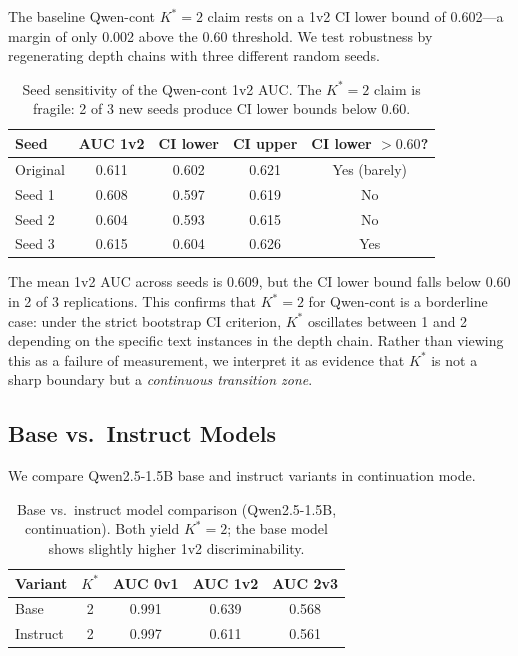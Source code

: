 \documentclass[11pt]{article}
\begin{document}
The baseline Qwen-cont $K^*{=}2$ claim rests on a 1v2 CI lower bound of 0.602---a margin of only 0.002 above the 0.60 threshold. We test robustness by regenerating depth chains with three different random seeds.

\begin{table}[h]
\centering
\caption{Seed sensitivity of the Qwen-cont 1v2 AUC. The $K^*{=}2$ claim is fragile: 2 of 3 new seeds produce CI lower bounds below 0.60.}
\label{tab:seeds}
\begin{tabular}{lcccc}
\toprule
Seed & AUC 1v2 & CI lower & CI upper & CI lower $> 0.60$? \\
\midrule
Original & 0.611 & 0.602 & 0.621 & Yes (barely) \\
Seed 1 & 0.608 & 0.597 & 0.619 & No \\
Seed 2 & 0.604 & 0.593 & 0.615 & No \\
Seed 3 & 0.615 & 0.604 & 0.626 & Yes \\
\bottomrule
\end{tabular}
\end{table}

The mean 1v2 AUC across seeds is 0.609, but the CI lower bound falls below 0.60 in 2 of 3 replications. This confirms that $K^*{=}2$ for Qwen-cont is a borderline case: under the strict bootstrap CI criterion, $K^*$ oscillates between 1 and 2 depending on the specific text instances in the depth chain. Rather than viewing this as a failure of measurement, we interpret it as evidence that $K^*$ is not a sharp boundary but a \emph{continuous transition zone}.

\subsection{Base vs.\ Instruct Models}
\label{sec:base_instruct}

We compare Qwen2.5-1.5B base and instruct variants in continuation mode.

\begin{table}[h]
\centering
\caption{Base vs.\ instruct model comparison (Qwen2.5-1.5B, continuation). Both yield $K^*{=}2$; the base model shows slightly higher 1v2 discriminability.}
\label{tab:base_instruct}
\begin{tabular}{lcccc}
\toprule
Variant & $K^*$ & AUC 0v1 & AUC 1v2 & AUC 2v3 \\
\midrule
Base & 2 & 0.991 & 0.639 & 0.568 \\
Instruct & 2 & 0.997 & 0.611 & 0.561 \\
\bottomrule
\end{tabular}
\end{table}
\end{document}
